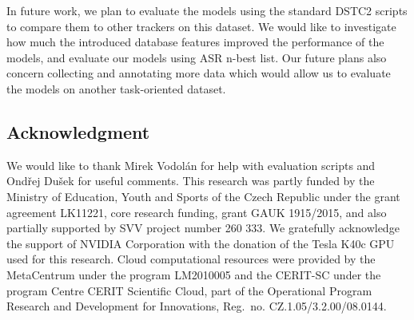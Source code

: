 \documentclass{itatnew}
\begin{document}
In future work, we plan to evaluate the models using the standard DSTC2 scripts to compare them to other trackers on this dataset.
We would like to investigate how much the introduced database features improved the performance of the models, and evaluate our models using ASR n-best list.
Our future plans also concern collecting and annotating more data which would allow us to evaluate the models on another task-oriented dataset.

\subsection*{Acknowledgment}
We would like to thank Mirek Vodolán for help with evaluation scripts and Ondřej Dušek for useful comments.
This research was partly funded by the Ministry of Education, Youth and Sports of the Czech Republic under the grant agreement LK11221, core research funding, grant GAUK 1915/2015, and also partially supported by SVV project number 260 333. 
We gratefully acknowledge the support of NVIDIA Corporation with the donation of the Tesla K40c GPU used for this research.
Cloud computational resources were provided by the MetaCentrum under the program LM2010005 and the CERIT-SC under the program Centre CERIT Scientific Cloud, part of the Operational Program Research and Development for Innovations, Reg.\ no. CZ.1.05/3.2.00/08.0144.

\newpage


\end{document}
